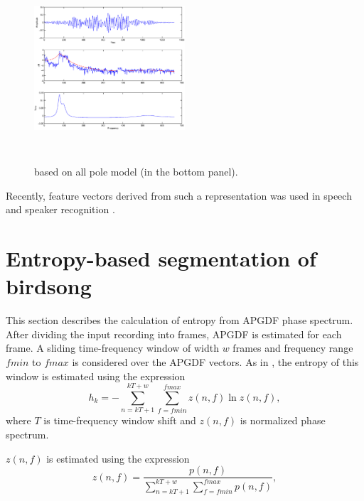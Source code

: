 \documentclass[a4paper]{article}
\begin{document}
\begin{figure}[h]
\centering
\includegraphics[width=0.5\textwidth,height=7cm]{apGd.eps}
\caption{based on all pole model (in the bottom panel).}
\label{fig:all-pole}
\end{figure}


Recently, feature vectors
derived from such a representation was used in speech \cite{drugman} and speaker
recognition \cite{padman}. 









\section{Entropy-based segmentation of birdsong}
This section describes the calculation of entropy from APGDF phase
spectrum. After dividing the input recording into frames, APGDF is estimated for each
frame. A sliding time-frequency window of width $w$ frames and frequency range
$fmin$ to $fmax$ is considered over the APGDF vectors. As in \cite{wang2013},
the entropy of this window is estimated using the expression
\begin{equation}
h_{k}=-\sum_{n=kT+1}^{kT+w}\sum_{f=fmin}^{fmax}z(n,f) \ln z(n,f),
\end{equation}
where $T$ is time-frequency window shift and $z(n,f)$ is normalized phase spectrum.


$z(n,f)$ is estimated using the expression \cite{wang2013}
\begin{equation}
z(n,f)=\frac {p(n,f)}
{\sum_{n=kT+1}^{kT+w}\sum_{f=fmin}^{fmax} p(n,f)},
\end{equation}
\end{document}
